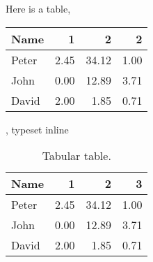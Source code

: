 \documentclass{amsart}
\begin{document}
Here is a table,
\begin{tabular}[b]{|l|r|r|r|}
    \hline
    Name &1 &2 &2 \\\hline
    Peter &2.45 &34.12 &1.00\\\hline
    John &0.00 &12.89 &3.71\\\hline
    David &2.00 &1.85 &0.71\\\hline
\end{tabular}, typeset inline

\begin{table}
    \begin{center}
        \begin{tabular}{|l|r|r|r|}
            \hline
            Name &1 &2 & 3\\\hline
            Peter &2.45 &34.12 &1.00\\\hline
            John &0.00 &12.89 &3.71\\\hline
            David &2.00 &1.85 &0.71\\\hline
        \end{tabular}
        \caption{Tabular table.}\label{Ta:first}
    \end{center}
\end{table}
\end{document}
